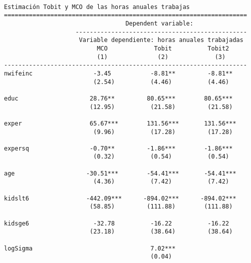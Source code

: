 \documentclass[
  letterpaper,
  DIV=11,
  numbers=noendperiod]{scrreprt}
\begin{document}
\begin{verbatim}

Estimación Tobit y MCO de las horas anuales trabajas
====================================================================
                                  Dependent variable:               
                    ------------------------------------------------
                     Variable dependiente: horas anuales trabajadas 
                          MCO             Tobit          Tobit2     
                          (1)              (2)             (3)      
--------------------------------------------------------------------
nwifeinc                 -3.45           -8.81**         -8.81**    
                         (2.54)          (4.46)          (4.46)     
                                                                    
educ                    28.76**         80.65***        80.65***    
                        (12.95)          (21.58)         (21.58)    
                                                                    
exper                   65.67***        131.56***       131.56***   
                         (9.96)          (17.28)         (17.28)    
                                                                    
expersq                 -0.70**         -1.86***        -1.86***    
                         (0.32)          (0.54)          (0.54)     
                                                                    
age                    -30.51***        -54.41***       -54.41***   
                         (4.36)          (7.42)          (7.42)     
                                                                    
kidslt6                -442.09***      -894.02***      -894.02***   
                        (58.85)         (111.88)        (111.88)    
                                                                    
kidsge6                  -32.78          -16.22          -16.22     
                        (23.18)          (38.64)         (38.64)    
                                                                    
logSigma                                 7.02***                    
                                         (0.04)                     
                                                                    

\end{verbatim}
\end{document}
